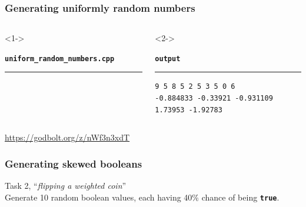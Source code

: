 \documentclass[aspectratio=169]{beamer}
\newcommand{\cpp}[1]{\texttt{\textbf{\textcolor{clCodeBlue}{#1}}}}
\begin{document}
\begin{frame}[fragile]
\frametitle{Generating uniformly random numbers}
\begin{columns}[T]
  \begin{column}{0.6\textwidth}<1->
    {\color[HTML]{cb4b16}
    \texttt{\textbf{uniform\_random\_numbers.cpp}}\vspace{-9pt}
    \rule{\linewidth}{2pt}}%
    {\fontsize{7}{6} }%
    \vspace{-12pt}{\color[HTML]{cb4b16}\rule{\linewidth}{2pt}}%
  \end{column}
  \begin{column}{0.3\textwidth}<2->
    {\color[HTML]{002b36}
    \texttt{\textbf{output}}\vspace{-9pt}
    \rule{\linewidth}{2pt}}%
    {\fontsize{8}{6} \begin{lstlisting}[showstringspaces=false]
9 5 8 5 2 5 3 5 0 6
-0.884833 -0.33921 -0.931109
1.73953 -1.92783
    \end{lstlisting}}
    \vspace{-12pt}{\color[HTML]{002b36}\rule{\linewidth}{2pt}}%
  \end{column}
\end{columns}
\pause{}
\begin{center}\url{https://godbolt.org/z/nWf3n3xdT}\end{center}
\end{frame}


\begin{frame}[fragile]
\frametitle{Generating skewed booleans}
  {\Large Task 2, ``\textit{flipping a weighted coin}''}\\
  \vspace{12pt}
  Generate 10 random boolean values, each having 40\% chance of being \cpp{true}.
\end{frame}
\end{document}
